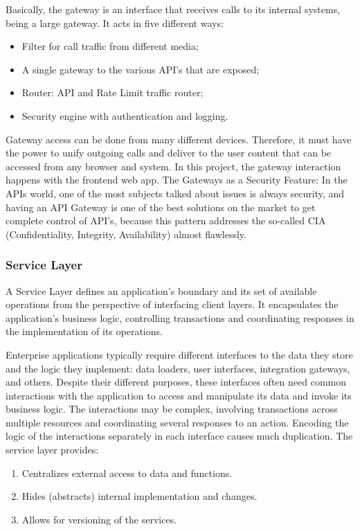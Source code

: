 Basically, the gateway is an interface that receives calls to its internal systems, being a large gateway. It acts in five different ways:

\begin{itemize}
\item Filter for call traffic from different media;
\item A single gateway to the various API's that are exposed;
\item Router: API and Rate Limit traffic router;
\item Security engine with authentication and logging.
\end{itemize}

Gateway access can be done from many different devices. Therefore, it must have the power to unify outgoing calls and deliver to the user content that can be accessed from any browser and system. In this project, the gateway interaction happens with the frontend web app. The Gateways as a Security Feature: In the APIs world, one of the most subjects talked about issues is always security, and having an API Gateway is one of the best solutions on the market to get complete control of API's, because this pattern addresses the so-called CIA (Confidentiality, Integrity, Availability) almost flawlessly.

\subsubsection{Service Layer}\label{sec:ServiceLayer}
A Service Layer defines an application's boundary and its set of available operations from the perspective of interfacing client layers. It encapsulates the application's business logic, controlling transactions and coordinating responses in the implementation of its operations.

Enterprise applications typically require different interfaces to the data they store and the logic they implement: data loaders, user interfaces, integration gateways, and others. Despite their different purposes, these interfaces often need common interactions with the application to access and manipulate its data and invoke its business logic. The interactions may be complex, involving transactions across multiple resources and coordinating several responses to an action. Encoding the logic of the interactions separately in each interface causes much duplication. The service layer provides:

\begin{enumerate}
\item Centralizes external access to data and functions.
\item Hides (abstracts) internal implementation and changes.
\item Allows for versioning of the services.
\end{enumerate}


